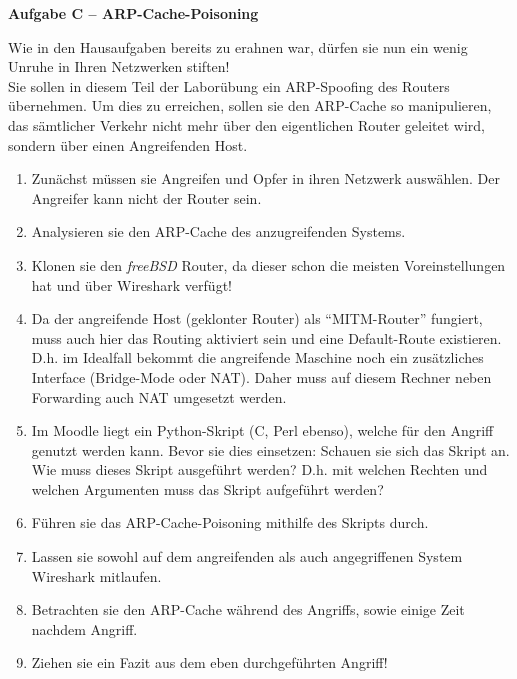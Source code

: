 \documentclass[paper=a4,fontsize=11pt]{scrartcl}%
\numberwithin{equation}{section}
\begin{document}
\begin{center}\Large{\textbf{Aufgabe C -- ARP-Cache-Poisoning}}\end{center}\vskip0.25in
Wie in den Hausaufgaben bereits zu erahnen war, dürfen sie nun ein wenig Unruhe in Ihren Netzwerken stiften!\\
Sie sollen in diesem Teil der Laborübung ein ARP-Spoofing des Routers übernehmen. Um dies zu erreichen, sollen sie den ARP-Cache so manipulieren, das sämtlicher Verkehr nicht mehr über den eigentlichen Router geleitet wird, sondern über einen Angreifenden Host.
\begin{enumerate}
	\item Zunächst müssen sie Angreifen und Opfer in ihren Netzwerk auswählen. Der Angreifer kann nicht der Router sein. 
	\item Analysieren sie den ARP-Cache des anzugreifenden Systems.
	\item Klonen sie den \emph{freeBSD} Router, da dieser schon die meisten Voreinstellungen hat und über Wireshark verfügt!
	\item Da der angreifende Host (geklonter Router) als \enquote{MITM-Router} fungiert, muss auch hier das Routing aktiviert sein und eine Default-Route existieren. D.h. im Idealfall bekommt die angreifende Maschine noch ein zusätzliches Interface (Bridge-Mode oder NAT). Daher muss auf diesem Rechner neben Forwarding auch NAT umgesetzt werden.
	\item Im Moodle liegt ein Python-Skript (C, Perl ebenso), welche für den Angriff genutzt werden kann. Bevor sie dies einsetzen: Schauen sie sich das Skript an. Wie muss dieses Skript ausgeführt werden? D.h. mit welchen Rechten und welchen Argumenten muss das Skript aufgeführt werden?
	\item Führen sie das ARP-Cache-Poisoning mithilfe des Skripts durch.
	\item Lassen sie sowohl auf dem angreifenden als auch angegriffenen System Wireshark mitlaufen.
	\item Betrachten sie den ARP-Cache während des Angriffs, sowie einige Zeit nachdem Angriff.
	\item Ziehen sie ein Fazit aus dem eben durchgeführten Angriff!
\end{enumerate}
\end{document}
